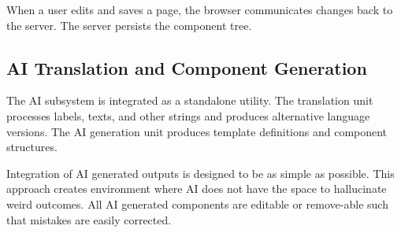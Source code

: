 When a user edits and saves a page, the browser communicates changes back to the server.
The server persists the component tree.

\subsection{AI Translation and Component Generation}\label{subsec:ai-translation-and-component-generation}
The AI subsystem is integrated as a standalone utility.
The translation unit processes labels, texts, and other strings and produces alternative language versions.
The AI generation unit produces template definitions and component structures.

Integration of AI generated outputs is designed to be as simple as possible.
This approach creates environment where AI does not have the space to hallucinate weird outcomes.
All AI generated components are editable or remove-able such that mistakes are easily corrected.